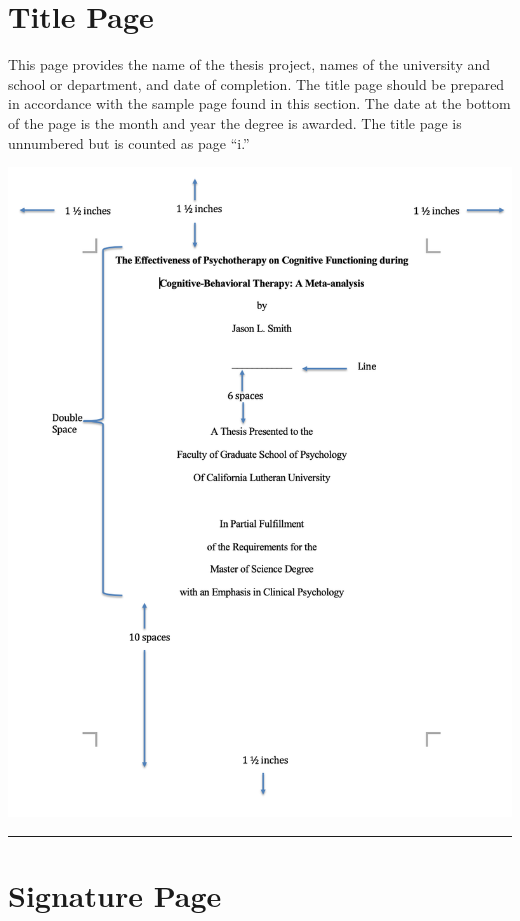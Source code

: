 \documentclass[
  openany]{book}
\begin{document}
\hypertarget{title-page}{%
\section{Title Page}\label{title-page}}

This page provides the name of the thesis project, names of the university and school or department, and date of completion. The title page should be prepared in accordance with the sample page found in this section. The date at the bottom of the page is the month and year the degree is awarded. The title page is unnumbered but is counted as page ``i.''

\includegraphics{images/titlepage.png}

\begin{center}\rule{0.5\linewidth}{0.5pt}\end{center}

\hypertarget{signature-page}{%
\section{Signature Page}\label{signature-page}}
\end{document}
